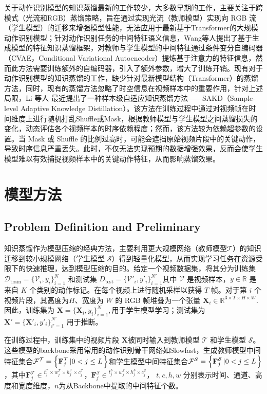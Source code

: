\documentclass[10.5pt,letterpaper]{article}
\begin{document}
关于动作识别模型的知识蒸馏最新的工作较少，大多数早期的工作\cite{crasto-cvpr2019-mars}\cite{stroud-wacv2020-d3d}\cite{thoker-icip2019-crosskd}，主要关注于跨模式（光流和RGB）蒸馏策略，旨在通过实现光流（教师模型）实现向 RGB 流（学生模型）的迁移来增强模型性能，无法应用于最新基于Transformer的大规模动作识别模型；针对动作识别任务的中间特征语义信息，Wang等人\cite{wang-aaai2024-gkd}提出了基于生成模型的特征知识蒸馏框架，对教师与学生模型的中间特征通过条件变分自编码器（CVAE，Conditional Variational Autoencoder）提炼基于注意力的特征信息，然而此方法需要训练额外的自编码器，引入了额外参数，增大了训练开销。现有对于动作识别模型的知识蒸馏的工作，缺少针对最新模型结构（Transformer）的蒸馏方法，同时，现有的蒸馏方法忽略了时空信息在视频样本中的重要作用，针对上述局限，Li 等人\cite{li-acmmm2025-slakd} 最近提出了一种样本级自适应知识蒸馏方法——SAKD（Sample-level Adaptive Knowledge Distillation）。该方法在训练过程中通过对视频帧在时间维度上进行随机打乱Shuffle或Mask，根据教师模型与学生模型之间蒸馏损失的变化，动态评估各个视频样本的时序依赖程度；然而，该方法较为依赖超参数的设置。当 Mask 或 Shuffle 的比例过高时，可能会遮挡原始视频片段中的关键动作，导致时序信息严重丢失。此时，不仅无法实现预期的数据增强效果，反而会使学生模型难以有效捕捉视频样本中的关键动作特征，从而影响蒸馏效果。

\section{模型方法}
\subsection{Problem Definition and Preliminary}

知识蒸馏作为模型压缩的经典方法，主要利用更大规模网络（教师模型$\mathcal{T}$）的知识迁移到较小规模网络（学生模型 $\mathcal{S}$）得到轻量化模型，从而实现学习任务在资源受限下的快速推理，达到模型压缩的目的。给定一个视频数据集，将其分为训练集 $\mathcal{D}_{\text{train}} = \{\mathcal{V}_i, y_i\}_{i=1}^N$
和测试集 $D_{\text{test}} = \{\mathcal{V'}_i, y'_i\}_{i=1}^{N'}$其中 $\mathcal{V}$ 是视频样本，$y \in \mathbb{R}$ 是来自 $K$ 个类别的动作标记。在每个视频上进行随机采样以获得 $T$ 帧。对于第 $i$ 个视频片段，其高度为$H$、宽度为 $W$ 的 RGB 帧堆叠为一个张量 $\textbf{X}_i \in \mathbb{R}^{3 \times T \times H \times W}.$
因此，训练集为 $\textbf{X} = \{\textbf{X}_i, y_i\}_{i=1}^N,	$用于学生模型学习；测试集为$\textbf{X}' = \{\textbf{X}'_i, y'_i\}_{i'=1}^{N'}$	用于推断。

在训练过程中，训练集中的视频片段 $\textbf{X}$被同时输入到教师模型 $\mathcal{T}$ 和学生模型 $\mathcal{S}$。这些模型的backbone采用常用的动作识别骨干网络如Slowfast\cite{feichtenhofer-iccv2019-slowfast}，生成教师模型中间特征集合${{\cal F}^\mathcal{T}} = \left\{ {{\textbf{F}}_{j}^\mathcal{T}\left| {0 < j \le L} \right.} \right\}$和学生模型中间特征集合${{\cal F}^\mathcal{S}} = \left\{ {{\textbf{F}}_{j}^\mathcal{S}\left| {0 < j \le L} \right.} \right\}$，其中${\textbf{F}}_j^\mathcal{T} \in {^{t_j^\mathcal{T} \times w_j^\mathcal{T} \times h_j^\mathcal{T} \times c_j^\mathcal{T}}}$，${\textbf{F}}_j^\mathcal{S} \in {^{t_j^\mathcal{S} \times w_j^\mathcal{S} \times h_j^\mathcal{S} \times c_j^\mathcal{S}}}$， $t,c, h, w$ 分别表示时间、通道、高度和宽度维度，$n$为从Backbone中提取的中间特征个数。
\end{document}
